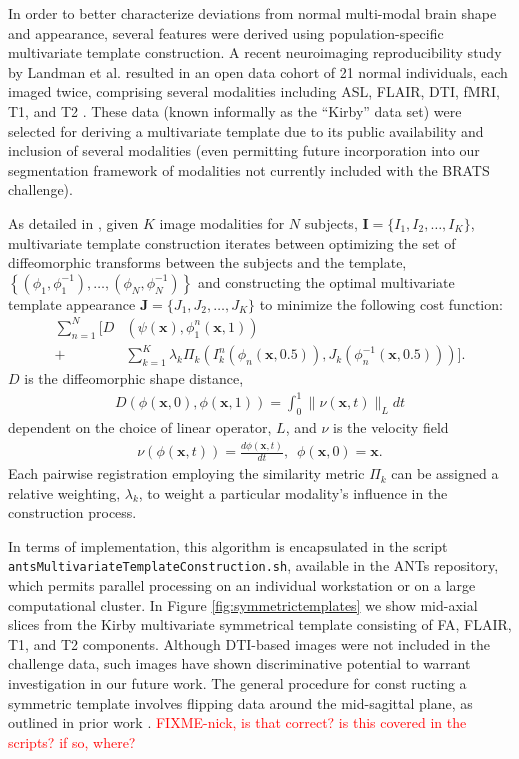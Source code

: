 \documentclass[final,5p,times,twocolumn]{elsarticle}
\begin{document}
In order to better characterize deviations from normal
multi-modal brain shape and appearance, several features were derived 
using population-specific multivariate template 
construction. A recent neuroimaging reproducibility study
by Landman et al. resulted in an open data cohort of 21
normal individuals, each imaged twice, comprising several
modalities including ASL, FLAIR, DTI, fMRI, T1, and T2 
\cite{landman2011}.  These data (known informally as the
``Kirby'' data set) were selected for deriving
a multivariate template due to its public availability and
inclusion of several modalities (even permitting future 
incorporation into our segmentation framework of modalities 
not currently included with the BRATS challenge).

As detailed in \cite{avants2008,avants2010}, 
given $K$ image modalities for $N$ subjects,  
${\mathbf I} = \{I_1,I_2,\ldots, I_K\}$, multivariate 
template construction iterates between optimizing the set 
of diffeomorphic transforms between the subjects and the 
template, 
$\left\{\left(\phi_1,\phi_1^{-1}\right),\ldots,\left(\phi_N,\phi_N^{-1}\right)\right\}$ 
and constructing the 
optimal multivariate template appearance 
$\mathbf{J}=\{J_1,J_2,\ldots, J_K\}$ to minimize the
following cost function:
\begin{align}
  \sum_{n=1}^N 
        \Bigg[ D &\left( \psi(\mathbf{x}),\phi_1^n(\mathbf{x},1)\right) \\ \nonumber 
        +& \sum_{k=1}^K \lambda_k \Pi_k \left(I_k^n\left(\phi_n(\mathbf{x},0.5)\right),J_k\left(\phi^{-1}_n(\mathbf{x},0.5)\right)\right)\Bigg].
\end{align}
$D$ is the diffeomorphic shape distance,
\begin{align}
D\left( \phi( \mathbf{x},0),\phi( \mathbf{x},1)\right) = \int_0^1 \| \nu(\mathbf{x},t)\|_L dt
\end{align}
dependent on the choice of linear operator, $L$, and $\nu$
is the velocity field
\begin{align}
\nu\left( \phi(\mathbf{x},t) \right) = \frac{d\phi(\mathbf{x},t)}{dt},\,\,\, \phi(\mathbf{x},0) = \mathbf{x}.
\end{align}
Each pairwise registration employing the similarity metric $\Pi_k$ can 
be assigned a relative weighting, $\lambda_k$, to weight a particular
modality's influence in the construction process.  

In terms of implementation, this algorithm is 
encapsulated in the script \verb#antsMultivariateTemplateConstruction.sh#,
available in the ANTs repository, which permits parallel processing on
an individual workstation or on a large computational cluster.  In
Figure \ref{fig:symmetrictemplates} we show mid-axial slices from
the Kirby multivariate symmetrical template consisting of FA, FLAIR,  
T1, and T2 components.  Although DTI-based images were not included in the
challenge data, such images have shown discriminative potential 
\citep[e.g.][]{price2003} to warrant investigation in our future
work.  The general procedure for const ructing a symmetric template involves flipping data around the mid-sagittal
plane, as outlined in prior work
\citep{Hopkins2013}. \textcolor{red}{FIXME-nick, is that correct? is
  this covered in the scripts?  if so, where?}
\end{document}
